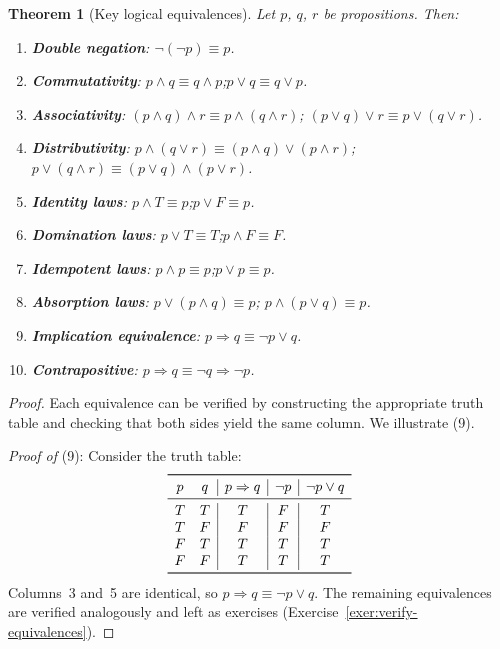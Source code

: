 \documentclass[12pt,a4paper,openany]{book}
\theoremstyle{definition}
\theoremstyle{plain}
\newtheorem{theorem}[definition]{Theorem}
\theoremstyle{remark}
\begin{document}
\begin{theorem}[Key logical equivalences]
\label{thm:logical-equivalences}
Let $p$, $q$, $r$ be propositions. Then:
\begin{enumerate}[nosep]
  \item \textbf{Double negation}: $\lnot(\lnot p) \equiv p$.
  \item \textbf{Commutativity}:
        $p \land q \equiv q \land p$;\quad $p \lor q \equiv q \lor p$.
  \item \textbf{Associativity}:
        $(p \land q) \land r \equiv p \land (q \land r)$;\quad
        $(p \lor q) \lor r \equiv p \lor (q \lor r)$.
  \item \textbf{Distributivity}:
        $p \land (q \lor r) \equiv (p \land q) \lor (p \land r)$;\quad
        $p \lor (q \land r) \equiv (p \lor q) \land (p \lor r)$.
  \item \textbf{Identity laws}: $p \land T \equiv p$;\quad $p \lor F \equiv p$.
  \item \textbf{Domination laws}: $p \lor T \equiv T$;\quad $p \land F \equiv F$.
  \item \textbf{Idempotent laws}: $p \land p \equiv p$;\quad $p \lor p \equiv p$.
  \item \textbf{Absorption laws}: $p \lor (p \land q) \equiv p$;\quad
        $p \land (p \lor q) \equiv p$.
  \item \textbf{Implication equivalence}:
        $p \Rightarrow q \equiv \lnot p \lor q$.
  \item \textbf{Contrapositive}:
        $p \Rightarrow q \equiv \lnot q \Rightarrow \lnot p$.
\end{enumerate}
\end{theorem}

\begin{proof}
Each equivalence can be verified by constructing the appropriate truth table and
checking that both sides yield the same column. We illustrate (9).

\medskip
\noindent\emph{Proof of} (9): Consider the truth table:
\[
\begin{array}{cc|c|c|c}
\toprule
p & q & p \Rightarrow q & \lnot p & \lnot p \lor q \\
\midrule
T & T & T & F & T \\
T & F & F & F & F \\
F & T & T & T & T \\
F & F & T & T & T \\
\bottomrule
\end{array}
\]
Columns~3 and~5 are identical, so $p \Rightarrow q \equiv \lnot p \lor q$.
The remaining equivalences are verified analogously and left as exercises
(Exercise~\ref{exer:verify-equivalences}).
\end{proof}
\end{document}
